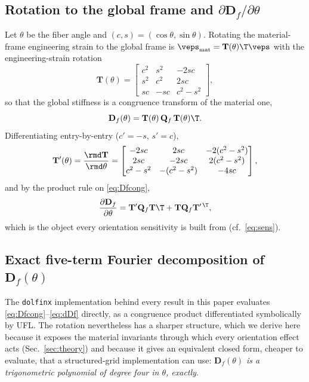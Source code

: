 \subsection{Rotation to the global frame and $\partial\mathbf D_f/\partial\theta$}
Let $\theta$ be the fiber angle and $(c,s)=(\cos\theta,\sin\theta)$. Rotating the
material-frame engineering strain to the global frame is $\veps_{\rm mat}=\mathbf
T(\theta)\T\veps$ with the engineering-strain rotation
\begin{equation}
  \mathbf T(\theta)=\begin{bmatrix} c^2 & s^2 & -2sc\\ s^2 & c^2 & 2sc\\
  sc & -sc & c^2-s^2\end{bmatrix},
\end{equation}
so that the global stiffness is a congruence transform of the material one,
\begin{equation}
  \mathbf D_f(\theta)=\mathbf T(\theta)\,\mathbf Q_f\,\mathbf T(\theta)\T .
  \label{eq:Dfcong}
\end{equation}
Differentiating entry-by-entry ($c'=-s$, $s'=c$),
\begin{equation}
  \mathbf T'(\theta)=\frac{\rmd\mathbf T}{\rmd\theta}
  =\begin{bmatrix} -2sc & 2sc & -2(c^2-s^2)\\ 2sc & -2sc & 2(c^2-s^2)\\
  c^2-s^2 & -(c^2-s^2) & -4sc\end{bmatrix},
\end{equation}
and by the product rule on \eqref{eq:Dfcong},
\begin{equation}
  \frac{\partial\mathbf D_f}{\partial\theta}
  =\mathbf T'\mathbf Q_f\mathbf T\T+\mathbf T\mathbf Q_f\mathbf T'^{\,\T},
  \label{eq:dDf}
\end{equation}
which is the object every orientation sensitivity is built from
(cf.\ \eqref{eq:sens}).

\subsection{Exact five-term Fourier decomposition of $\mathbf D_f(\theta)$}
\label{app:fourier}
The \texttt{dolfinx} implementation behind every result in this paper evaluates
\eqref{eq:Dfcong}--\eqref{eq:dDf} directly, as a congruence product differentiated
symbolically by UFL. The rotation nevertheless has a sharper structure, which we derive
here because it exposes the material invariants through which every orientation effect
acts (Sec.~\ref{sec:theory}) and because it gives an equivalent closed form, cheaper to
evaluate, that a structured-grid implementation can use: \emph{$\mathbf D_f(\theta)$ is a
trigonometric polynomial of degree four in $\theta$, exactly}.

